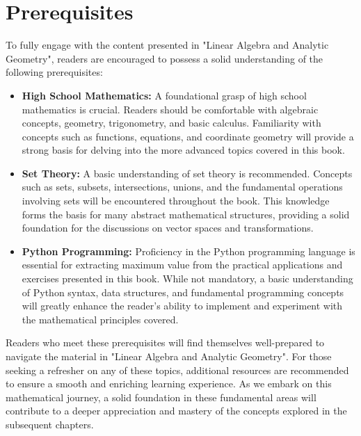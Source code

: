 \chapter*{Prerequisites}
To fully engage with the content presented in "Linear Algebra and Analytic Geometry", readers are encouraged to possess a solid understanding of the following prerequisites:

\begin{itemize}

    \item \textbf{High School Mathematics:} A foundational grasp of high school mathematics is crucial. Readers should be comfortable with algebraic concepts, geometry, trigonometry, and basic calculus. Familiarity with concepts such as functions, equations, and coordinate geometry will provide a strong basis for delving into the more advanced topics covered in this book.

    \item \textbf{Set Theory:} A basic understanding of set theory is recommended. Concepts such as sets, subsets, intersections, unions, and the fundamental operations involving sets will be encountered throughout the book. This knowledge forms the basis for many abstract mathematical structures, providing a solid foundation for the discussions on vector spaces and transformations.

    \item \textbf{Python Programming:} Proficiency in the Python programming language is essential for extracting maximum value from the practical applications and exercises presented in this book. While not mandatory, a basic understanding of Python syntax, data structures, and fundamental programming concepts will greatly enhance the reader's ability to implement and experiment with the mathematical principles covered.

\end{itemize}

\noindent
Readers who meet these prerequisites will find themselves well-prepared to navigate the material in "Linear Algebra and Analytic Geometry". For those seeking a refresher on any of these topics, additional resources are recommended to ensure a smooth and enriching learning experience. As we embark on this mathematical journey, a solid foundation in these fundamental areas will contribute to a deeper appreciation and mastery of the concepts explored in the subsequent chapters.

